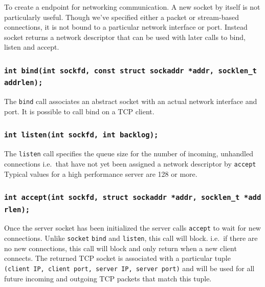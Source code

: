 \documentclass[]{article}
\begin{document}
To create a endpoint for networking communication. A new socket by
itself is not particularly useful. Though we've specified either a
packet or stream-based connections, it is not bound to a particular
network interface or port. Instead socket returns a network descriptor
that can be used with later calls to bind, listen and accept.

\subsubsection{\texorpdfstring{\texttt{int\ bind(int\ sockfd,\ const\ struct\ sockaddr\ *addr,\ socklen\_t\ addrlen);}}{int bind(int sockfd, const struct sockaddr *addr, socklen\_t addrlen);}}\label{int-bindint-sockfd-const-struct-sockaddr-addr-socklenux5ft-addrlen}

The \texttt{bind} call associates an abstract socket with an actual
network interface and port. It is possible to call bind on a TCP client.

\subsubsection{\texorpdfstring{\texttt{int\ listen(int\ sockfd,\ int\ backlog);}}{int listen(int sockfd, int backlog);}}\label{int-listenint-sockfd-int-backlog}

The \texttt{listen} call specifies the queue size for the number of
incoming, unhandled connections i.e.~that have not yet been assigned a
network descriptor by \texttt{accept} Typical values for a high
performance server are 128 or more.

\subsubsection{\texorpdfstring{\texttt{int\ accept(int\ sockfd,\ struct\ sockaddr\ *addr,\ socklen\_t\ *addrlen);}}{int accept(int sockfd, struct sockaddr *addr, socklen\_t *addrlen);}}\label{int-acceptint-sockfd-struct-sockaddr-addr-socklenux5ft-addrlen}

Once the server socket has been initialized the server calls
\texttt{accept} to wait for new connections. Unlike \texttt{socket}
\texttt{bind} and \texttt{listen}, this call will block. i.e.~if there
are no new connections, this call will block and only return when a new
client connects. The returned TCP socket is associated with a particular
tuple \texttt{(client\ IP,\ client\ port,\ server\ IP,\ server\ port)}
and will be used for all future incoming and outgoing TCP packets that
match this tuple.
\end{document}
